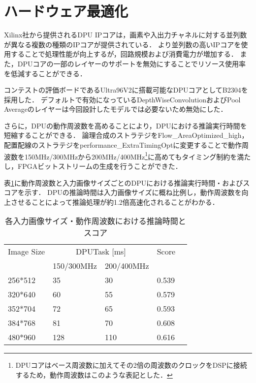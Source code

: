 \section{ハードウェア最適化}
Xilinx社から提供されるDPU IPコアは，画素や入出力チャネルに対する並列数が異なる複数の種類のIPコアが提供されている．
より並列数の高いIPコアを使用することで処理性能が向上するが，回路規模および消費電力が増加する．
また，DPUコアの一部のレイヤーのサポートを無効にすることでリソース使用率を低減することができる．

コンテストの評価ボードであるUltra96V2に搭載可能なDPUコアとしてB2304を採用した．
デフォルトで有効になっているDepthWiseConvolutionおよびPool Averageのレイヤーは今回設計したモデルでは必要ないため無効にした．

さらに，DPUの動作周波数を高めることにより，DPUにおける推論実行時間を短縮することができる．
論理合成のストラテジをFlow\_AreaOptimized\_high，配置配線のストラテジをperformance\_ExtraTimingOptに変更することで動作周波数を150MHz/300MHzから200MHz/400MHz\footnote{DPUコアはベース周波数に加えてその2倍の周波数のクロックをDSPに接続するため，動作周波数はこのような表記とした．}に高めてもタイミング制約を満たし，FPGAビットストリームの生成を行うことができた．

表\ref{runtimetable}に動作周波数と入力画像サイズごとのDPUにおける推論実行時間・およびスコアを示す．
DPUの推論時間は入力画像サイズに概ね比例し，動作周波数を向上させることによって推論処理が約1.2倍高速化されることがわかる．
\begin{table}[h]
    \label{runtimetable}
    \caption{各入力画像サイズ・動作周波数における推論時間とスコア}
    \begin{center}
        \begin{tabular}{lllll}
            Image Size & \multicolumn{2}{c}{DPUTask {[}ms{]}}                            & \multicolumn{1}{c}{Score} &  \\
                & \multicolumn{1}{r}{150/300MHz} & \multicolumn{1}{r}{200/400MHz} &                           &  \\ \hline
        256*512 & 35                             & 30                             & 0.539                     &  \\ \hline
        320*640 & 60                             & 55                             & 0.579                     &  \\ \hline
        352*704 & 72                             & 65                             & 0.593                     &  \\ \hline
        384*768 & 81                             & 70                             & 0.608                     &  \\ \hline
        480*960 & 128                            & 110                            & 0.616                     & 
        \end{tabular}
    \end{center}
\end{table}
